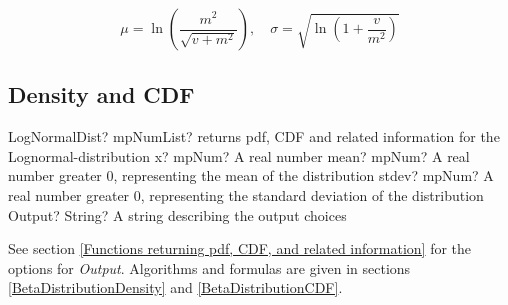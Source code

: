 \begin{equation}
	\mu = \ln \left(\frac{m^2}{\sqrt{v+m^2}}\right), \quad \sigma = \sqrt{\ln\left(1+\frac{v}{m^2} \right)}
\end{equation}


\subsection{Density and CDF}

\begin{mpFunctionsExtract}
	\mpFunctionFour
	{LogNormalDist? mpNumList? returns pdf, CDF and related information for the Lognormal-distribution}
	{x? mpNum? A real number}
	{mean? mpNum? A real number greater 0, representing the mean of the distribution}
	{stdev? mpNum? A real number greater 0, representing the standard deviation of the distribution}
	{Output? String? A string describing the output choices}
\end{mpFunctionsExtract}


\vspace{0.3cm}
See section \ref{Functions returning pdf, CDF, and related information} for the options for {\itshape\sffamily Output}. Algorithms and formulas are given in sections \ref{BetaDistributionDensity} and \ref{BetaDistributionCDF}.


%
%
%




